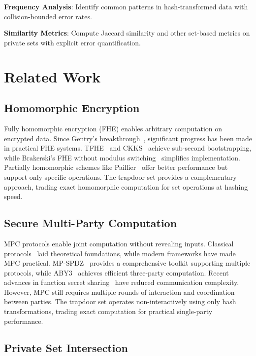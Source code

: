 \documentclass[10pt,conference]{IEEEtran}
\begin{document}
\textbf{Frequency Analysis}: Identify common patterns in hash-transformed data with collision-bounded error rates.

\textbf{Similarity Metrics}: Compute Jaccard similarity and other set-based metrics on private sets with explicit error quantification.


\section{Related Work}
\label{sec:related}

\subsection{Homomorphic Encryption}

Fully homomorphic encryption (FHE) enables arbitrary computation on encrypted data. Since Gentry's breakthrough~\cite{gentry2009fully}, significant progress has been made in practical FHE systems. TFHE~\cite{chillotti2020tfhe} and CKKS~\cite{cheon2017homomorphic} achieve sub-second bootstrapping, %
while Brakerski's FHE without modulus switching~\cite{brakerski2012fully} simplifies implementation. Partially homomorphic schemes like Paillier~\cite{paillier1999public} offer better performance but support only specific operations. The trapdoor set provides a complementary approach, trading exact homomorphic computation for set operations at hashing speed.

\subsection{Secure Multi-Party Computation}

MPC protocols enable joint computation without revealing inputs. Classical protocols~\cite{yao1982protocols, goldreich1987play} laid theoretical foundations, while modern frameworks have made MPC practical. MP-SPDZ~\cite{keller2020mp} provides a comprehensive toolkit supporting multiple protocols, while ABY3~\cite{mohassel2018aby3} achieves efficient three-party computation. Recent advances in function secret sharing~\cite{boyle2021function} have reduced communication complexity. However, MPC still requires multiple rounds of interaction and coordination between parties. The trapdoor set operates non-interactively using only hash transformations, trading exact computation for practical single-party performance.

\subsection{Private Set Intersection}
\end{document}
